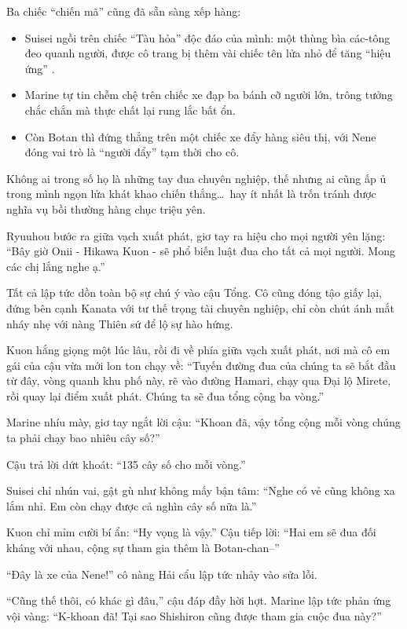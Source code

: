 \documentclass[../main.tex]{subfiles}
\begin{document}
Ba chiếc ``chiến mã'' cũng đã sẵn sàng xếp hàng:

\begin{itemize}
  \item Suisei ngồi trên chiếc ``Tàu hỏa'' độc đáo của mình: một thùng bìa các-tông đeo quanh người, được cô trang bị thêm vài chiếc tên lửa nhỏ để tăng ``hiệu ứng'' .
  \item Marine tự tin chễm chệ trên chiếc xe đạp ba bánh cỡ người lớn, trông tưởng chắc chắn mà thực chất lại rung lắc bất ổn.
  \item Còn Botan thì đứng thẳng trên một chiếc xe đẩy hàng siêu thị, với Nene đóng vai trò là ``người đẩy'' tạm thời cho cô.
\end{itemize}

Không ai trong số họ là những tay đua chuyên nghiệp, thế nhưng ai cũng ấp ủ trong mình ngọn lửa khát khao chiến thắng\dots\ hay ít nhất là trốn tránh được nghĩa vụ bồi thường hàng chục triệu yên.

Ryuuhou bước ra giữa vạch xuất phát, giơ tay ra hiệu cho mọi người yên lặng: ``Bây giờ Onii - Hikawa Kuon - sẽ phổ biến luật đua cho tất cả mọi người. Mong các chị lắng nghe ạ.''

Tất cả lập tức dồn toàn bộ sự chú ý vào cậu Tổng. Cô cũng đóng tậo giấy lại, đứng bên cạnh Kanata với tư thế trọng tài chuyên nghiệp, chỉ còn chút ánh mắt nháy nhẹ với nàng Thiên sứ để lộ sự hào hứng.

Kuon hắng giọng một lúc lâu, rồi đi về phía giữa vạch xuất phát, nơi mà cô em gái của cậu vừa mới lon ton chạy về: ``Tuyến đường đua của chúng ta sẽ bắt đầu từ đây, vòng quanh khu phố này, rẽ vào đường Hamari, chạy qua Đại lộ Mirete, rồi quay lại điểm xuất phát. Chúng ta sẽ đua tổng cộng ba vòng.''

Marine nhíu mày, giơ tay ngắt lời cậu: ``Khoan đã, vậy tổng cộng mỗi vòng chúng ta phải chạy bao nhiêu cây số?''

Cậu trả lời dứt khoát: ``135 cây số cho mỗi vòng.''

Suisei chỉ nhún vai, gật gù như không mấy bận tâm: ``Nghe có vẻ cũng không xa lắm nhỉ. Em còn chạy được cả nghìn cây số nữa là.''

Kuon chỉ mỉm cười bí ẩn: ``Hy vọng là vậy.'' Cậu tiếp lời: ``Hai em sẽ đua đối kháng với nhau, cộng sự tham gia thêm là Botan-chan--''

``Đây là xe của Nene!'' cô nàng Hải cẩu lập tức nhảy vào sửa lỗi.

``Cũng thế thôi, có khác gì đâu,'' cậu đáp đầy hời hợt. Marine lập tức phản ứng vội vàng: ``K-khoan đã! Tại sao Shishiron cũng được tham gia cuộc đua này?''
\end{document}
